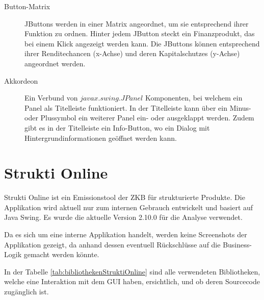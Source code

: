  \begin{description}
    \item[Button-Matrix]
    JButtons werden in einer Matrix angeordnet, um sie entsprechend ihrer
    Funktion zu ordnen. Hinter jedem JButton steckt ein Finanzprodukt, das bei
    einem Klick angezeigt werden kann. Die JButtons können entsprechend
    ihrer Renditechancen (x-Achse) und deren Kapitalschutzes (y-Achse)
    angeordnet werden.
    \item[Akkordeon]
    Ein Verbund von \(javax.swing.JPanel\) Komponenten, bei welchem ein
    Panel als Titelleiste funktioniert. In der Titelleiste kann über ein Minus-
    oder Plussymbol ein weiterer Panel ein- oder ausgeklappt werden. Zudem gibt
    es in der Titelleiste ein Info-Button, wo ein Dialog mit
    Hintergrundinformationen geöffnet werden kann.
  \end{description}
  
  \section{Strukti Online}
  
  Strukti Online ist ein Emissionstool der \ac{ZKB} für strukturierte Produkte.
  Die Applikation wird aktuell nur zum internen Gebrauch entwickelt und basiert
  auf Java Swing. Es wurde die aktuelle Version 2.10.0 für die Analyse
  verwendet.
  
  Da es sich um eine interne Applikation handelt, werden keine Screenshots
  der Applikation gezeigt, da anhand dessen eventuell Rückschlüsse auf die
  Business-Logik gemacht werden könnte.
  
  In der Tabelle \ref{tab:bibliothekenStruktiOnline} sind alle verwendeten
  Bibliotheken, welche eine Interaktion mit dem \ac{GUI} haben, ersichtlich,
  und ob deren Sourcecode zugänglich ist.
  
